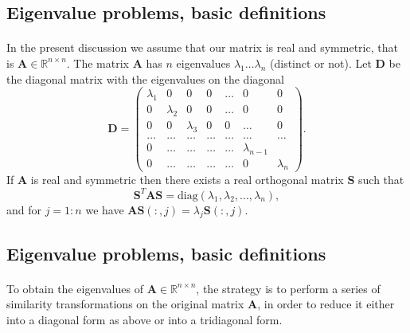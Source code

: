 \subsection*{Eigenvalue problems, basic definitions}

\paragraph{}
In the present discussion we assume that our matrix is real and symmetric, that is 
$\mathbf{A}\in {\mathbb{R}}^{n\times n}$.
The matrix $\mathbf{A}$ has $n$ eigenvalues
$\lambda_1\dots \lambda_n$ (distinct or not). Let $\mathbf{D}$ be the
diagonal matrix with the eigenvalues on the diagonal
\[
\mathbf{D}=    \left( \begin{array}{ccccccc} \lambda_1 & 0 & 0   & 0    & \dots  &0     & 0 \\
                                0 & \lambda_2 & 0 & 0    & \dots  &0     &0 \\
                                0   & 0 & \lambda_3 & 0  &0       &\dots & 0\\
                                \dots  & \dots & \dots & \dots  &\dots      &\dots & \dots\\
                                0   & \dots & \dots & \dots  &\dots       &\lambda_{n-1} & \\
                                0   & \dots & \dots & \dots  &\dots       &0 & \lambda_n
             \end{array} \right).
\]
If $\mathbf{A}$ is real and symmetric then there exists a real orthogonal matrix $\mathbf{S}$ such that
\[
     \mathbf{S}^T \mathbf{A}\mathbf{S}= \mathrm{diag}(\lambda_1,\lambda_2,\dots ,\lambda_n),
\]
and for $j=1:n$ we have $\mathbf{A}\mathbf{S}(:,j) = \lambda_j \mathbf{S}(:,j)$.



\subsection*{Eigenvalue problems, basic definitions}

\paragraph{}
To obtain the eigenvalues of $\mathbf{A}\in {\mathbb{R}}^{n\times n}$,
the strategy is to
perform a series of similarity transformations on the original
matrix $\mathbf{A}$, in order to reduce it either into a  diagonal form as above
or into a  tridiagonal form. 

